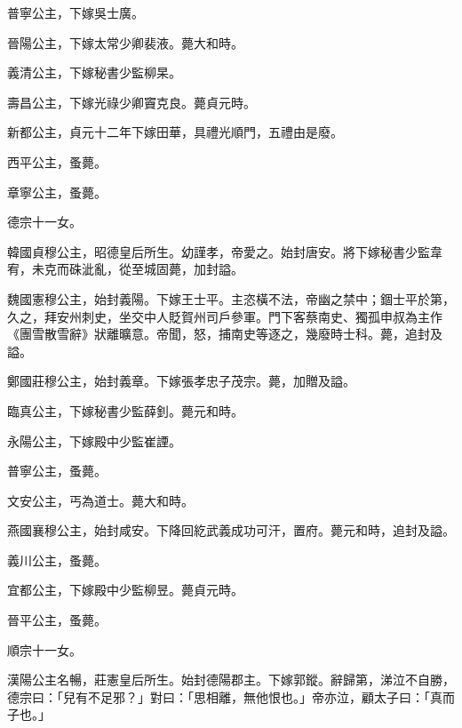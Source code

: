 \begin{pinyinscope}
 普寧公主，下嫁吳士廣。



 晉陽公主，下嫁太常少卿裴液。薨大和時。



 義清公主，下嫁秘書少監柳杲。



 壽昌公主，下嫁光祿少卿竇克良。薨貞元時。



 新都公主，貞元十二年下嫁田華，具禮光順門，五禮由是廢。



 西平公主，蚤薨。



 章寧公主，蚤薨。



 德宗十一女。



 韓國貞穆公主，昭德皇后所生。幼謹孝，帝愛之。始封唐安。將下嫁秘書少監韋宥，未克而硃泚亂，從至城固薨，加封謚。



 魏國憲穆公主，始封義陽。下嫁王士平。主恣橫不法，帝幽之禁中；錮士平於第，久之，拜安州刺史，坐交中人貶賀州司戶參軍。門下客蔡南史、獨孤申叔為主作《團雪散雪辭》狀離曠意。帝聞，怒，捕南史等逐之，幾廢時士科。薨，追封及謚。



 鄭國莊穆公主，始封義章。下嫁張孝忠子茂宗。薨，加贈及謚。



 臨真公主，下嫁秘書少監薛釗。薨元和時。



 永陽公主，下嫁殿中少監崔諲。



 普寧公主，蚤薨。



 文安公主，丐為道士。薨大和時。



 燕國襄穆公主，始封咸安。下降回紇武義成功可汗，置府。薨元和時，追封及謚。



 義川公主，蚤薨。



 宜都公主，下嫁殿中少監柳昱。薨貞元時。



 晉平公主，蚤薨。



 順宗十一女。



 漢陽公主名暢，莊憲皇后所生。始封德陽郡主。下嫁郭鏦。辭歸第，涕泣不自勝，德宗曰：「兒有不足邪？」對曰：「思相離，無他恨也。」帝亦泣，顧太子曰：「真而子也。」




\end{pinyinscope}
